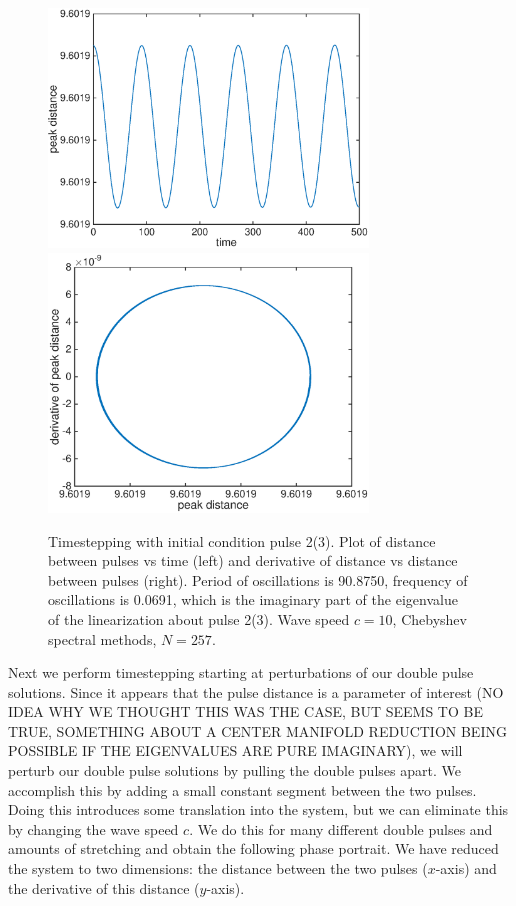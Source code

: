 \documentclass[12pt]{article}
\begin{document}
\begin{figure}[H]
	\includegraphics[width=8.5cm]{cheb10dist2_0}
	\includegraphics[width=8.5cm]{cheb10deriv2_0}
	\caption{Timestepping with initial condition pulse 2(3). Plot of distance between pulses vs time (left) and derivative of distance vs distance between pulses (right). Period of oscillations is 90.8750, frequency of oscillations is 0.0691, which is the imaginary part of the eigenvalue of the linearization about pulse 2(3). Wave speed $c = 10$, Chebyshev spectral methods, $N = 257$.}
\end{figure}

Next we perform timestepping starting at perturbations of our double pulse solutions. Since it appears that the pulse distance is a parameter of interest (NO IDEA WHY WE THOUGHT THIS WAS THE CASE, BUT SEEMS TO BE TRUE, SOMETHING ABOUT A CENTER MANIFOLD REDUCTION BEING POSSIBLE IF THE EIGENVALUES ARE PURE IMAGINARY), we will perturb our double pulse solutions by pulling the double pulses apart. We accomplish this by adding a small constant segment between the two pulses. Doing this introduces some translation into the system, but we can eliminate this by changing the wave speed $c$. We do this for many different double pulses and amounts of stretching and obtain the following phase portrait. We have reduced the system to two dimensions: the distance between the two pulses ($x$-axis) and the derivative of this distance ($y$-axis).
\end{document}
